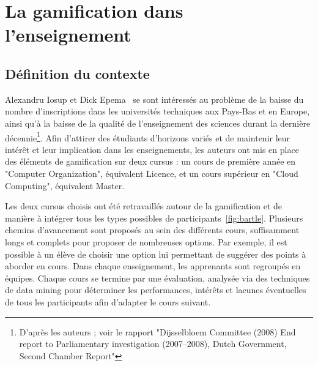 \section{La gamification dans l'enseignement}
\subsection{Définition du contexte}
Alexandru Iosup et Dick Epema~\cite{gamif-educ} se sont intéressés au problème de la baisse du nombre d'inscriptions dans les universités techniques aux Pays-Bas et en Europe, ainsi qu'à la baisse de la qualité de l'enseignement des sciences durant la dernière décennie\footnote{D'après les auteurs ; voir le rapport "Dijsselbloem Committee (2008) End report to Parliamentary
investigation (2007–2008), Dutch Government, Second
Chamber Report"}. Afin d'attirer des étudiants d'horizons variés et de maintenir leur intérêt et leur implication dans les enseignements, les auteurs ont mis en place des éléments de gamification sur deux cursus : un cours de première année en "Computer Organization", équivalent Licence, et un cours supérieur en "Cloud Computing", équivalent Master. \par
Les deux cursus choisis ont été retravaillés autour de la gamification et de manière à intégrer tous les types possibles de participants~\ref{fig:bartle}. Plusieurs chemins d'avancement sont proposés au sein des différents cours, suffisamment longs et complets pour proposer de nombreuses options. Par exemple, il est possible à un élève de choisir une option lui permettant de suggérer des points à aborder en cours. Dans chaque enseignement, les apprenants sont regroupés en équipes. Chaque cours se termine par une évaluation, analysée via des techniques de data mining pour déterminer les performances, intérêts et lacunes éventuelles de tous les participants afin d'adapter le cours suivant.

